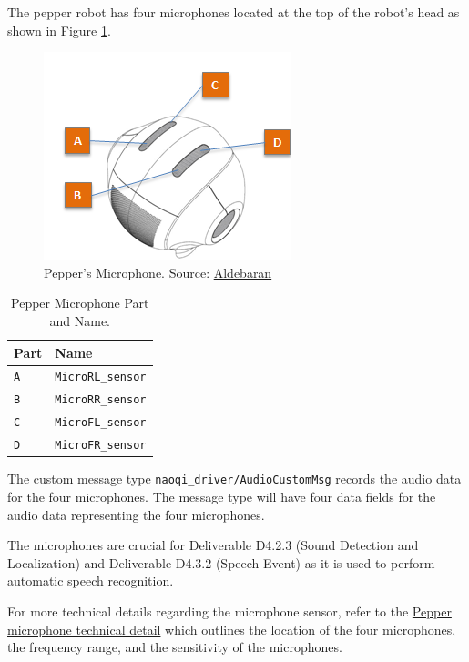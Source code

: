 \documentclass{CSSRforAfrica}
\begin{document}
The pepper robot has four microphones located at the top of the robot's head as shown in Figure \ref{fig:Microphone}. 
\begin{figure}[!hbpt]
	\centering
	\includegraphics{images/Pepper_Microphone.png}
	\caption{Pepper's Microphone. Source: \href{http://doc.aldebaran.com/2-5/family/pepper_technical/microphone_pep.html}{Aldebaran}}
	\label{fig:Microphone}
\end{figure}

\newpage

\begin{longtable}[c]{|p{1.5cm}|p{6cm}|}
	\caption{Pepper Microphone Part and Name.} \label{tab:microphone_part_name}\\
	\hline
	\rowcolor{gray!30}
	\textbf{Part} & \textbf{Name} \\ \hline
	\endhead %
	\large{\texttt{A}} & \large{\texttt{MicroRL\_sensor}} \\ \hline
	\large{\texttt{B}} & \large{\texttt{MicroRR\_sensor}} \\ \hline
	\large{\texttt{C}} & \large{\texttt{MicroFL\_sensor}} \\ \hline
	\large{\texttt{D}} & \large{\texttt{MicroFR\_sensor}} \\ \hline
\end{longtable}

The custom message type \texttt{naoqi\_driver/AudioCustomMsg} records the audio data for the four microphones. The message type will have four data fields for the audio data representing 
the four microphones. 

The microphones are crucial for Deliverable D4.2.3 (Sound Detection and Localization) and Deliverable D4.3.2
(Speech Event) as it is used to perform automatic speech recognition. 

For more technical details regarding the microphone sensor, refer to the \href{http://doc.aldebaran.com/2-5/family/pepper_technical/microphone_pep.html}{Pepper microphone technical detail} 
which outlines the location of the four microphones, the frequency range, and the sensitivity of the microphones.
\end{document}

